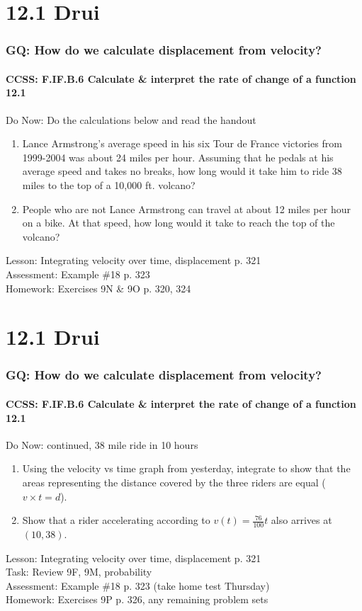 \documentclass{beamer}
\begin{document}
  \section{12.1 Drui}
  \frame
  {
    \frametitle{GQ: How do we calculate displacement from velocity?}
    \framesubtitle{CCSS: F.IF.B.6 Calculate \& interpret the rate of change of a function \qquad \alert{12.1}}

    \begin{block}{Do Now: Do the calculations below and read the handout}
    \begin{enumerate}
        \item Lance Armstrong’s average speed in his six Tour de France victories from 1999-2004 was about 24 miles per hour. Assuming that he pedals at his average speed and takes no breaks, how long would it take him to ride 38 miles to the top of a 10,000 ft. volcano?
        \item People who are not Lance Armstrong can travel at about 12 miles per hour on a bike. At that speed, how long would it take to reach the top of the volcano?
    \end{enumerate}
    \end{block}
    Lesson: Integrating velocity over time, displacement p. 321\\%
    Assessment: Example \#18 p. 323 \\%
    Homework: Exercises 9N \& 9O p. 320, 324
  }

  \section{12.1 Drui}
  \frame
  {
    \frametitle{GQ: How do we calculate displacement from velocity?}
    \framesubtitle{CCSS: F.IF.B.6 Calculate \& interpret the rate of change of a function \qquad \alert{12.1}}

    \begin{block}{Do Now: continued, 38 mile ride in 10 hours}
    \begin{enumerate}
        \item Using the velocity vs time graph from yesterday, integrate to show that the areas representing the distance covered by the three riders are equal ($v \times t = d$).
        \item Show that a rider accelerating according to $v(t)= \frac{76}{100}t$ also arrives at $(10,38)$.
    \end{enumerate}
    \end{block}
    Lesson: Integrating velocity over time, displacement p. 321\\%
    Task: Review 9F, 9M, probability\\%
    Assessment: Example \#18 p. 323 (take home test Thursday)\\%
    Homework: Exercises 9P p. 326, any remaining problem sets
  }
\end{document}
